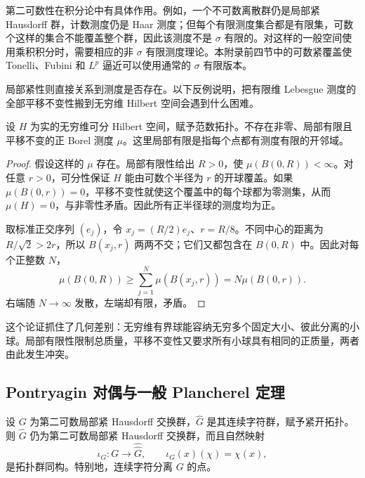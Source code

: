 第二可数性在积分论中有具体作用。例如，一个不可数离散群仍是局部紧 Hausdorff 群，计数测度仍是 Haar 测度；但每个有限测度集合都是有限集，可数个这样的集合不能覆盖整个群，因此该测度不是 \(\sigma\) 有限的。对这样的一般空间使用乘积积分时，需要相应的非 \(\sigma\) 有限测度理论。本附录前四节中的可数紧覆盖使 Tonelli、Fubini 和 \(L^p\) 逼近可以使用通常的 \(\sigma\) 有限版本。

局部紧性则直接关系到测度是否存在。以下反例说明，把有限维 Lebesgue 测度的全部平移不变性搬到无穷维 Hilbert 空间会遇到什么困难。

\begin{proposition}
\label{b2:prop:I5-infinite-dimensional-measure}
设 \(H\) 为实的无穷维可分 Hilbert 空间，赋予范数拓扑。不存在非零、局部有限且平移不变的正 Borel 测度 \(\mu\)。这里局部有限是指每个点都有测度有限的开邻域。
\end{proposition}
\begin{proof}
假设这样的 \(\mu\) 存在。局部有限性给出 \(R>0\)，使 \(\mu(B(0,R))<\infty\)。对任意 \(r>0\)，可分性保证 \(H\) 能由可数个半径为 \(r\) 的开球覆盖。如果 \(\mu(B(0,r))=0\)，平移不变性就使这个覆盖中的每个球都为零测集，从而 \(\mu(H)=0\)，与非零性矛盾。因此所有正半径球的测度均为正。

取标准正交序列 \((e_j)\)，令 \(x_j=(R/2)e_j\)、\(r=R/8\)。不同中心的距离为 \(R/\sqrt2>2r\)，所以 \(B(x_j,r)\) 两两不交；它们又都包含在 \(B(0,R)\) 中。因此对每个正整数 \(N\)，
\[
 \mu(B(0,R))\ge\sum_{j=1}^N\mu(B(x_j,r))
 =N\mu(B(0,r)).
\]
右端随 \(N\to\infty\) 发散，左端却有限，矛盾。
\end{proof}

这个论证抓住了几何差别：无穷维有界球能容纳无穷多个固定大小、彼此分离的小球。局部有限性限制总质量，平移不变性又要求所有小球具有相同的正质量，两者由此发生冲突。

\subsection{Pontryagin 对偶与一般 Plancherel 定理}
\label{b2:subsec:I20502}

\begin{claim}
\label{b2:claim:I5-pontryagin}
设 \(G\) 为第二可数局部紧 Hausdorff 交换群，\(\widehat G\) 是其连续字符群，赋予紧开拓扑。则 \(\widehat G\) 仍为第二可数局部紧 Hausdorff 交换群，而且自然映射
\[
 \iota_G:G\longrightarrow\widehat{\widehat G},\qquad
 \iota_G(x)(\chi)=\chi(x),
\]
是拓扑群同构。特别地，连续字符分离 \(G\) 的点。
\end{claim}


